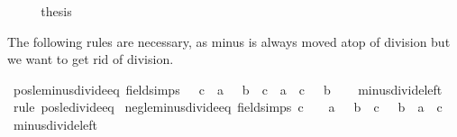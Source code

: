 \begin{isabellebody}
\ \ \isamarkupfalse%
\ \isamarkupfalse%
\ {\isacharquery}{\kern0pt}thesis\ \isacommand{{\isachardot}{\kern0pt}}\isamarkupfalse%
\isanewline
{}\isamarkupfalse%
%
\endisatagproof
{\isafoldproof}%
%
\isadelimproof
%
\endisadelimproof
%
\begin{isamarkuptext}%
The following  rules are necessary, as minus is always moved atop of
division but we want to get rid of division.%
\end{isamarkuptext}\isamarkuptrue%
\isamarkupfalse%
\ pos{\isacharunderscore}{\kern0pt}le{\isacharunderscore}{\kern0pt}minus{\isacharunderscore}{\kern0pt}divide{\isacharunderscore}{\kern0pt}eq\ {\isacharbrackleft}{\kern0pt}field{\isacharunderscore}{\kern0pt}simps{\isacharbrackright}{\kern0pt}{\isacharcolon}{\kern0pt}\ {\isachardoublequoteopen}{}\ {\isacharless}{\kern0pt}\ c\ {\isasymLongrightarrow}\ a\ {\isasymle}\ {\isacharminus}{\kern0pt}\ {\isacharparenleft}{\kern0pt}b\ {\isacharslash}{\kern0pt}\ c{\isacharparenright}{\kern0pt}\ {\isasymlongleftrightarrow}\ a\ {\isacharasterisk}{\kern0pt}\ c\ {\isasymle}\ {\isacharminus}{\kern0pt}\ b{\isachardoublequoteclose}\isanewline
%
\isadelimproof
\ \ %
\endisadelimproof
%
\isatagproof
{}\isamarkupfalse%
\ minus{\isacharunderscore}{\kern0pt}divide{\isacharunderscore}{\kern0pt}left\ \isamarkupfalse%
\ {\isacharparenleft}{\kern0pt}rule\ pos{\isacharunderscore}{\kern0pt}le{\isacharunderscore}{\kern0pt}divide{\isacharunderscore}{\kern0pt}eq{\isacharparenright}{\kern0pt}%
\endisatagproof
{\isafoldproof}%
%
\isadelimproof
\isanewline
%
\endisadelimproof
\isanewline
{}\isamarkupfalse%
\ neg{\isacharunderscore}{\kern0pt}le{\isacharunderscore}{\kern0pt}minus{\isacharunderscore}{\kern0pt}divide{\isacharunderscore}{\kern0pt}eq\ {\isacharbrackleft}{\kern0pt}field{\isacharunderscore}{\kern0pt}simps{\isacharbrackright}{\kern0pt}{\isacharcolon}{\kern0pt}\ {\isachardoublequoteopen}c\ {\isacharless}{\kern0pt}\ {}\ {\isasymLongrightarrow}\ a\ {\isasymle}\ {\isacharminus}{\kern0pt}\ {\isacharparenleft}{\kern0pt}b\ {\isacharslash}{\kern0pt}\ c{\isacharparenright}{\kern0pt}\ {\isasymlongleftrightarrow}\ {\isacharminus}{\kern0pt}\ b\ {\isasymle}\ a\ {\isacharasterisk}{\kern0pt}\ c{\isachardoublequoteclose}\isanewline
%
\isadelimproof
\ \ %
\endisadelimproof
%
\isatagproof
{}\isamarkupfalse%
\ minus{\isacharunderscore}{\kern0pt}divide{\isacharunderscore}{\kern0pt}left\ \isamarkupfalse%

\end{isabellebody}
